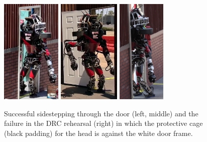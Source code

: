 \documentclass[letterpaper,12pt,fullpage]{article}
\begin{document}
\begin{figure}[t]
  \centering
  \hbox{}
      \includegraphics[height=5cm]{figs/door1-5.png}
      \hbox{}
      \includegraphics[height=5cm]{figs/door1-3.png}
      \hbox{}
      \includegraphics[height=5cm]{figs/door-stuckc2.png}
      \hbox{}
      \caption{Successful sidestepping through the door (left, middle)
        and the failure in the DRC rehearsal (right) in which the protective
        cage (black padding) for the head is against the white door frame.}
      \label{figDoor}
\end{figure}
\end{document}
